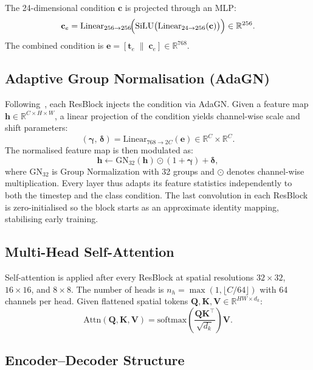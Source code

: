 \documentclass[12pt, a4paper]{report}
\begin{document}
The 24-dimensional condition $\mathbf{c}$ is projected through an MLP:
\[
  \mathbf{c}_e
    = \mathrm{Linear}_{256\to256}\!\Bigl(
        \mathrm{SiLU}\bigl(
          \mathrm{Linear}_{24\to256}(\mathbf{c})
        \bigr)
      \Bigr) \in \mathbb{R}^{256}.
\]
The combined condition is $\mathbf{e} = [\mathbf{t}_e \;\|\; \mathbf{c}_e] \in \mathbb{R}^{768}$.

\subsection{Adaptive Group Normalisation (AdaGN)}

Following~\cite{dhariwal2021beatgans}, each ResBlock injects the condition via AdaGN.
Given a feature map $\mathbf{h} \in \mathbb{R}^{C \times H \times W}$, a linear
projection of the condition yields channel-wise scale and shift parameters:
\[
  (\boldsymbol\gamma,\, \boldsymbol\delta)
    = \mathrm{Linear}_{768 \to 2C}(\mathbf{e})
    \in \mathbb{R}^{C} \times \mathbb{R}^{C}.
\]
The normalised feature map is then modulated as:
\[
  \mathbf{h}
    \leftarrow \mathrm{GN}_{32}(\mathbf{h}) \odot (1 + \boldsymbol\gamma)
               + \boldsymbol\delta,
\]
where $\mathrm{GN}_{32}$ is Group Normalization with 32 groups and $\odot$ denotes
channel-wise multiplication.
Every layer thus adapts its feature statistics independently to both the timestep
and the class condition.
The last convolution in each ResBlock is zero-initialised so the block starts as an
approximate identity mapping, stabilising early training.

\subsection{Multi-Head Self-Attention}

Self-attention is applied after every ResBlock at spatial resolutions $32\times32$,
$16\times16$, and $8\times8$.
The number of heads is $n_h = \max(1, \lfloor C/64 \rfloor)$ with 64 channels per head.
Given flattened spatial tokens $\mathbf{Q},\mathbf{K},\mathbf{V} \in \mathbb{R}^{HW \times d_k}$:
\[
  \mathrm{Attn}(\mathbf{Q},\mathbf{K},\mathbf{V})
    = \mathrm{softmax}\!\left(\frac{\mathbf{Q}\mathbf{K}^\top}{\sqrt{d_k}}\right)\mathbf{V}.
\]

\subsection{Encoder--Decoder Structure}
\end{document}
